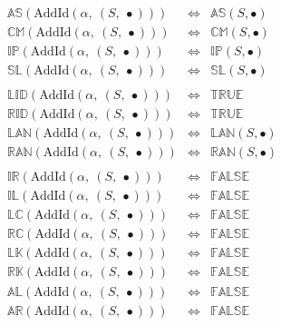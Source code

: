 \documentclass[10pt]{report}
\newcommand{\propname}[1]{{\mathbb{#1}}}
\begin{document}
\[
\begin{array}{rcl} 
\propname{AS}(\mathrm{AddId}(\alpha,\ (S,\ \bullet))) 
  & \Leftrightarrow
  & \propname{AS}(S, \bullet) \\
\propname{CM}(\mathrm{AddId}(\alpha,\ (S,\ \bullet))) 
  & \Leftrightarrow
  & \propname{CM}(S, \bullet) \\
\propname{IP}(\mathrm{AddId}(\alpha,\ (S,\ \bullet))) 
  & \Leftrightarrow
  & \propname{IP}(S, \bullet) \\
\propname{SL}(\mathrm{AddId}(\alpha,\ (S,\ \bullet))) 
  & \Leftrightarrow
  & \propname{SL}(S, \bullet) \\\\
  
\propname{LID}(\mathrm{AddId}(\alpha,\ (S,\ \bullet))) 
  & \Leftrightarrow
  & \propname{TRUE} \\ 
\propname{RID}(\mathrm{AddId}(\alpha,\ (S,\ \bullet))) 
  & \Leftrightarrow
  & \propname{TRUE} \\ 
\propname{LAN}(\mathrm{AddId}(\alpha,\ (S,\ \bullet))) 
  & \Leftrightarrow
  & \propname{LAN}(S, \bullet) \\
\propname{RAN}(\mathrm{AddId}(\alpha,\ (S,\ \bullet))) 
  & \Leftrightarrow
  & \propname{RAN}(S, \bullet) \\\\
  
\propname{IR}(\mathrm{AddId}(\alpha,\ (S,\ \bullet))) 
  & \Leftrightarrow
  & \propname{FALSE}\\ 
\propname{IL}(\mathrm{AddId}(\alpha,\ (S,\ \bullet))) 
  & \Leftrightarrow
  & \propname{FALSE}\\ 
\propname{LC}(\mathrm{AddId}(\alpha,\ (S,\ \bullet))) 
  & \Leftrightarrow
  & \propname{FALSE} \\
\propname{RC}(\mathrm{AddId}(\alpha,\ (S,\ \bullet))) 
  & \Leftrightarrow
  & \propname{FALSE} \\
\propname{LK}(\mathrm{AddId}(\alpha,\ (S,\ \bullet))) 
  & \Leftrightarrow
  & \propname{FALSE}\\ 
\propname{RK}(\mathrm{AddId}(\alpha,\ (S,\ \bullet))) 
  & \Leftrightarrow
  & \propname{FALSE}\\ 
\propname{AL}(\mathrm{AddId}(\alpha,\ (S,\ \bullet))) 
  & \Leftrightarrow
  & \propname{FALSE}\\ 
\propname{AR}(\mathrm{AddId}(\alpha,\ (S,\ \bullet))) 
  & \Leftrightarrow
  & \propname{FALSE}\\ 
\end{array} 
\] 
\end{document}
